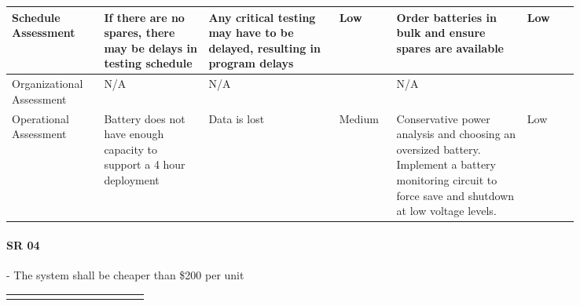 \begin{landscape}
{\begin{longtable}{| p{0.12\linewidth} | p{0.16\linewidth} |  p{0.20\linewidth} | p{0.08\linewidth} | p{0.20\linewidth} | p{0.08\linewidth} |}
	\hline
	Schedule \newline Assessment & If there are no spares, there may be delays in testing schedule & Any critical testing may have to be delayed, resulting in program delays & \cellcolor{green} Low & Order batteries in bulk and ensure spares are available & \cellcolor{green} Low \\
	\hline
	Organizational \newline Assessment & N/A & N/A & \cellcolor[gray]{0.8} & N/A & \cellcolor[gray]{0.8} \\
	\hline
	Operational \newline Assessment & Battery does not have enough capacity to support a 4 hour deployment & Data is lost & \cellcolor{yellow} Medium & Conservative power analysis and choosing an oversized battery. \newline Implement a battery monitoring circuit to force save and shutdown at low voltage levels. & \cellcolor{green} Low
	\label{tab:sr03_feasibility}
\end{longtable}
}
\newpage



\paragraph*{SR 04} - The system shall be cheaper than \$200 per unit

{\fontsize{8pt}{8pt}\selectfont
\begin{longtable}{| p{0.12\linewidth} | p{0.16\linewidth} |  p{0.20\linewidth} | p{0.08\linewidth} | p{0.20\linewidth} | p{0.08\linewidth} |}
	\hline \endlastfoot


\end{longtable}}
\end{landscape}
